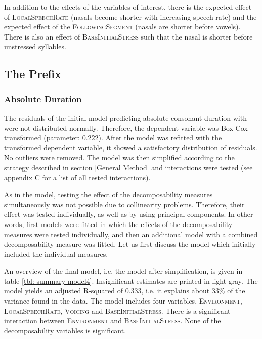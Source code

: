 In addition to the effects of the variables of interest, there is the expected effect of \textsc{LocalSpeechRate} (nasals become shorter with increasing speech rate) and the expected effect of the \textsc{FollowingSegment} (nasals are shorter before vowels). There is also an effect of \textsc{BaseInitialStress} such that the nasal is shorter before unstressed syllables.

\subsection{The Prefix } \label{corpus results dis}


\subsubsection{Absolute Duration}

The residuals of the initial model predicting absolute consonant duration with  were not distributed normally. Therefore, the dependent variable was Box-Cox-transformed (parameter:  $0.222$). After the model was refitted with the transformed dependent variable, it showed a satisfactory distribution of residuals. No outliers were removed. The model was then simplified according to the strategy described in section \ref{General Method}  and interactions were tested (see \hyperref[Appendix C: Summaries of tested interactions in corpus study]{appendix C} for a list of all tested interactions).

As in the model, testing the effect of the decomposability measures simultaneously was not possible due to collinearity problems. Therefore, their effect was tested individually, as well as by using principal components. In other words, first models were fitted in which the effects of the decomposability measures were tested individually, and then an additional model with a combined decomposability measure was fitted. 
 Let us first discuss the model which initially included the individual measures.

An overview of the final model, i.e. the model after simplification, is given in table \ref{tbl: summary model4}. Insignificant estimates are printed in light gray. The model yields an adjusted R-squared of  0.333, i.e. it explains about 33\% of the variance found in the data. The model includes four variables, \textsc{Environment}, \textsc{LocalSpeechRate}, \textsc{Voicing} and \textsc{BaseInitialStress}. There is a significant interaction between \textsc{Environment} and \textsc{BaseInitialStress}. None of the decomposability variables is significant.


